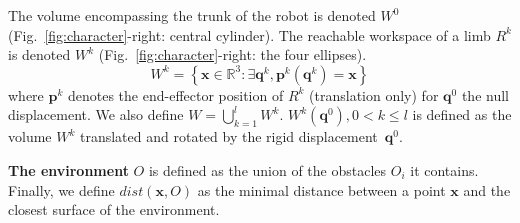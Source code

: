 \medskip
The volume encompassing the trunk of the robot is denoted $W^0$ (Fig.~\ref{fig:character}-right: central cylinder). The reachable workspace of a limb $R^k$ is denoted $W^k$ (Fig.~\ref{fig:character}-right: the four ellipses). 
\begin{equation}
  W^k = \left\{ {\mathbf{x} \in \mathbb{R}^3: \exists \mathbf{q}^k, \mathbf{p}^k(\mathbf{q}^k) = \mathbf{x} } \right\}
\end{equation}
where $\mathbf{p}^k$ denotes the end-effector position of $R^k$ (translation only) for $\mathbf{q}^0$ the null displacement. We also define $W = \bigcup_{k=1}^{l}W^k$.
%
$W^k(\mathbf{q}^{0}), 0 < k \leq l$ is defined as the volume $W^k$ translated and rotated by the rigid displacement~$\mathbf{q}^{0}$.

\medskip
\textbf{The environment} $O$ is defined as the union of the obstacles $O_i$ it contains.
Finally, we define $dist(\mathbf{x}, O)$ as the minimal distance between a point $\mathbf{x}$ and the closest surface of the environment.
